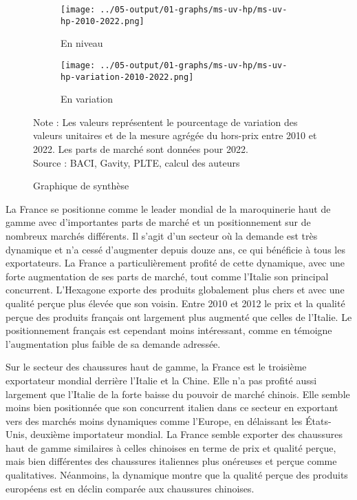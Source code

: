 \documentclass[french,10pt,a4paper]{article}
\begin{document}
\begin{figure}[!h]
  \centering
  \begin{subfigure}{\textwidth}
    \centering    \texttt{[image: ../05-output/01-graphs/ms-uv-hp/ms-uv-hp-2010-2022.png]}
    \caption{En niveau}
    \label{fig:ms-uv-hp}
  \end{subfigure}
  \vspace{0.5cm}
  \begin{subfigure}{\textwidth}
    \centering \texttt{[image: ../05-output/01-graphs/ms-uv-hp/ms-uv-hp-variation-2010-2022.png]}
 \caption{En variation}
 \label{fig:ms-uv-hp-variation}
  \end{subfigure}
  \captionsetup{justification=justified, singlelinecheck=false, font=small}
  \caption*{Note : Les valeurs représentent le pourcentage de variation des valeurs unitaires et de la mesure agrégée du hors-prix entre 2010 et 2022. Les parts de marché sont données pour 2022.\\
  Source : BACI, Gavity, PLTE, calcul des auteurs}
  \captionsetup{justification=centering, singlelinecheck=true, font=normalsize}
  \caption{Graphique de synthèse}
  \label{fig:graph-synthese}
\end{figure}

\bigskip

La France se positionne comme le leader mondial de la maroquinerie haut de gamme avec d'importantes parts de marché et un positionnement sur de nombreux marchés différents. Il s'agit d'un secteur où la demande est très dynamique et n'a cessé d'augmenter depuis douze ans, ce qui bénéficie à tous les exportateurs. La France a particulièrement profité de cette dynamique, avec une forte augmentation de ses parts de marché, tout comme l'Italie son principal concurrent. L'Hexagone exporte des produits globalement plus chers et avec une qualité perçue plus élevée que son voisin. Entre 2010 et 2012 le prix et la qualité perçue des produits français ont largement plus augmenté que celles de l'Italie. Le positionnement français est cependant moins intéressant, comme en témoigne l'augmentation plus faible de sa demande adressée.

\bigskip

Sur le secteur des chaussures haut de gamme, la France est le troisième exportateur mondial derrière l'Italie et la Chine. Elle n'a pas profité aussi largement que l'Italie de la forte baisse du pouvoir de marché chinois. Elle semble moins bien positionnée que son concurrent italien dans ce secteur en exportant vers des marchés moins dynamiques comme l'Europe, en délaissant les États-Unis, deuxième importateur mondial. La France semble exporter des chaussures haut de gamme similaires à celles chinoises en terme de prix et qualité perçue, mais bien différentes des chaussures italiennes plus onéreuses et perçue comme qualitatives. Néanmoins, la dynamique montre que la qualité perçue des produits européens est en déclin comparée aux chaussures chinoises.
\end{document}
